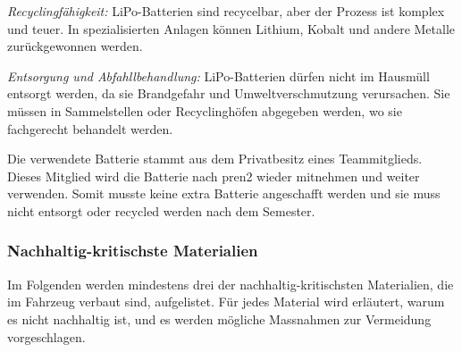 \textit{Recyclingfähigkeit:} LiPo-Batterien sind recycelbar, aber der Prozess ist komplex und teuer. In spezialisierten Anlagen können Lithium, Kobalt und andere Metalle zurückgewonnen werden.\cite{regan-2023}


\textit{Entsorgung und Abfahllbehandlung:} LiPo-Batterien dürfen nicht im Hausmüll entsorgt
werden, da sie Brandgefahr und Umweltverschmutzung verursachen. Sie müssen in Sammelstellen oder Recyclinghöfen abgegeben werden, wo sie fachgerecht behandelt werden.

Die verwendete Batterie stammt aus dem Privatbesitz eines Teammitglieds. Dieses Mitglied wird die Batterie nach \acrshort{pren2} wieder mitnehmen und weiter verwenden. Somit musste keine extra Batterie angeschafft werden und sie muss nicht entsorgt oder recycled werden nach dem Semester.


\subsubsection{Nachhaltig-kritischste Materialien}
Im Folgenden werden mindestens drei der nachhaltig-kritischsten Materialien, die im Fahrzeug verbaut sind, aufgelistet. Für jedes Material wird erläutert, warum es nicht nachhaltig ist, und es werden mögliche Massnahmen zur Vermeidung vorgeschlagen.

